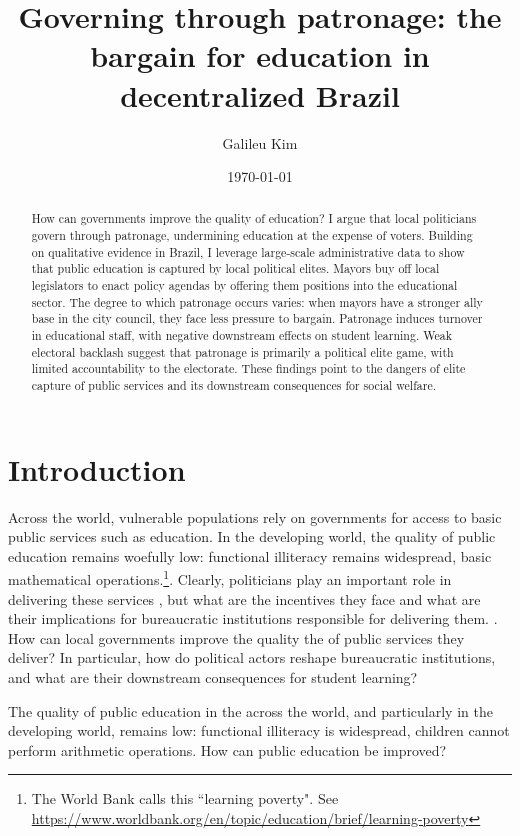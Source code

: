 \documentclass[12pt,a4paper]{article}
\title{Governing through patronage: the bargain for education in decentralized Brazil}
\date{\today}
\author{Galileu Kim}
\affil{Princeton University}
\begin{document}
\maketitle

\begin{abstract}
    How can governments improve the quality of education? I argue that local politicians govern through patronage, undermining education at the expense of voters. Building on qualitative evidence in Brazil, I leverage large-scale administrative data to show that public education is captured by local political elites. Mayors buy off local legislators to enact policy agendas by offering them positions into the educational sector. The degree to which patronage occurs varies: when mayors have a stronger ally base in the city council, they face less pressure to bargain. Patronage induces turnover in educational staff, with negative downstream effects on student learning. Weak electoral backlash suggest that patronage is primarily a political elite game, with limited accountability to the electorate. These findings point to the dangers of elite capture of public services and its downstream consequences for social welfare.
\end{abstract}

\newpage
\section{Introduction}

Across the world, vulnerable populations rely on governments for access to basic public services such as education. In the developing world, the quality of public education remains woefully low: functional illiteracy remains widespread, basic mathematical operations.\footnote{The World Bank calls this ``learning poverty". See \url{https://www.worldbank.org/en/topic/education/brief/learning-poverty}}. Clearly, politicians play an important role in delivering these services \citep{gulzar_politicians_2017,besley_political_2003}, but what are the incentives they face and what are their implications for bureaucratic institutions responsible for delivering them. \citep{cochrane_policies_1983, falleti_decentralization_2010}. How can local governments improve the quality the of public services they deliver? In particular, how do political actors reshape bureaucratic institutions, and what are their downstream consequences for student learning?

The quality of public education in the across the world, and particularly in the developing world, remains low: functional illiteracy is widespread, children cannot perform arithmetic operations. How can public education be improved? 
\end{document}
